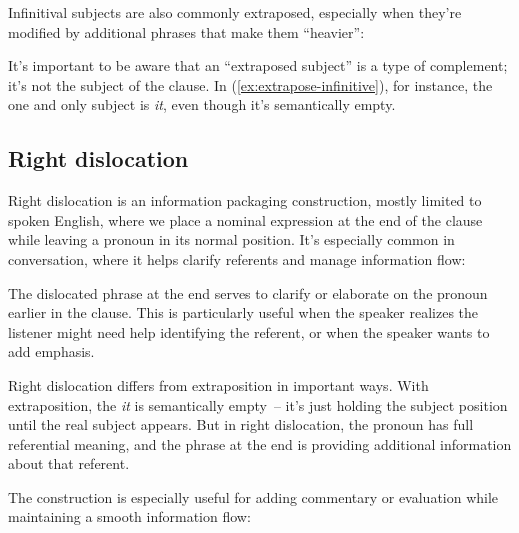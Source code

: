 Infinitival subjects are also commonly extraposed, especially when they're modified by additional phrases that make them ``heavier'':

\ea\label{ex:extrapose-infinitive}
    \z
\z

It's important to be aware that an ``extraposed subject'' is a type of complement; it's not the subject of the clause. In (\ref{ex:extrapose-infinitive}), for instance, the one and only subject is \textit{it}, even though it's semantically empty.

\subsection{Right dislocation} \label{sec:right-dislocation}

Right dislocation is an information packaging construction, mostly limited to spoken English, where we place a nominal expression at the end of the clause while leaving a pronoun in its normal position. It's especially common in conversation, where it helps clarify referents and manage information flow:

\ea\label{ex:right-dis-basic}
   \z
\z

The dislocated phrase at the end serves to clarify or elaborate on the pronoun earlier in the clause. This is particularly useful when the speaker realizes the listener might need help identifying the referent, or when the speaker wants to add emphasis.

Right dislocation differs from extraposition in important ways. With extraposition, the \textit{it} is semantically empty~-- it's just holding the subject position until the real subject appears. But in right dislocation, the pronoun has full referential meaning, and the phrase at the end is providing additional information about that referent.

The construction is especially useful for adding commentary or evaluation while maintaining a smooth information flow:

\ea\label{ex:right-dis-comment}
   \z
\z

